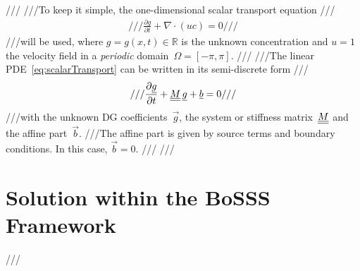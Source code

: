 {///\label{sec:scalarConvection_problem}
///To keep it simple, the one-dimensional scalar transport equation
///\begin{align} \label{eq:scalarTransport}
///\frac{\partial g}{\partial t} + \nabla \cdot \left(uc\right) = 0
///\end{align}
///will be used, where $g=g(x,t) \in \mathbb{R}$ is the unknown concentration and $u=1$ the velocity field in a \emph{periodic} domain~$\Omega = \left[-\pi,\pi\right]$.
///
///The linear PDE~\eqref{eq:scalarTransport} can be written in its semi-discrete form
///\begin{align} \label{eq:semiDiscreteForm}
///\frac{\partial \vec g}{\partial t} + \matrix{M} \, \vec g + \vec b = 0
///\end{align}
///with the unknown DG coefficients~$\vec g$, the system or stiffness matrix~$\underline{\underline{M}}$ and the affine part~$\vec b$. 
///The affine part is given by source terms and boundary conditions. In this case, $\vec b = 0$.
///
///\section{Solution within the BoSSS Framework}
///\label{sec:scalarConvection_tutorial}
 }
\BoSSSexeSilent
{}
\BoSSSexeSilent
{}
\BoSSSexe
{}
\BoSSSexe
{}
\BoSSSexe
{}
\BoSSSexe
